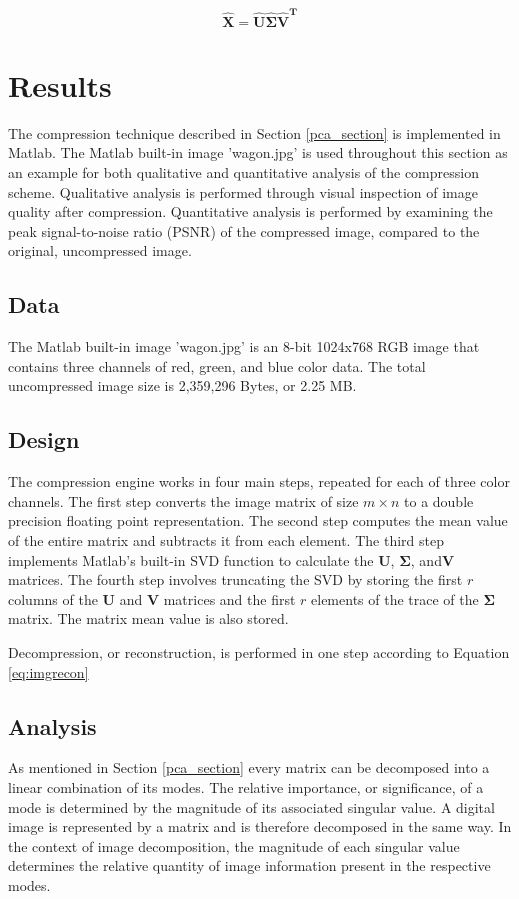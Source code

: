 \documentclass[conference]{IEEEtran}
\begin{document}
    \begin{equation}
        \mathbf{\hat{X}} = \mathbf{\hat{U}{\hat{\Sigma}}\hat{V}^T}
    \label{eq:imgrecon}
    \end{equation}
    \section{Results}

    The compression technique described in Section \ref{pca_section} is implemented in Matlab. The Matlab built-in image 'wagon.jpg' is used throughout this section as an example for both qualitative and quantitative analysis of the compression scheme. Qualitative analysis is performed through visual inspection of image quality after compression. Quantitative analysis is performed by examining the peak signal-to-noise ratio (PSNR) of the compressed image, compared to the original, uncompressed image.

    \subsection{Data}
    The Matlab built-in image 'wagon.jpg' is an 8-bit 1024x768 RGB image that contains three channels of red, green, and blue color data. The total uncompressed image size is 2,359,296 Bytes, or 2.25 MB.

    \subsection{Design}
    The compression engine works in four main steps, repeated for each of three color channels. The first step converts the image matrix of size $m \times n$ to a double precision floating point representation. The second step computes the mean value of the entire matrix and subtracts it from each element. The third step implements Matlab's built-in SVD function to calculate the $\mathbf{U}$, $\mathbf{\Sigma}$, and$\mathbf{V}$ matrices. The fourth step involves truncating the SVD by storing the first $r$ columns of the $\mathbf{U}$ and $\mathbf{V}$ matrices and the first $r$ elements of the trace of the $\mathbf{\Sigma}$ matrix. The matrix mean value is also stored.

    Decompression, or reconstruction, is performed in one step according to Equation \ref{eq:imgrecon}
    
    \subsection{Analysis}
    As mentioned in Section \ref{pca_section} every matrix can be decomposed into a linear combination of its modes. The relative importance, or significance, of a mode is determined by the magnitude of its associated singular value. A digital image is represented by a matrix and is therefore decomposed in the same way. In the context of image decomposition, the magnitude of each singular value determines the relative quantity of image information present in the respective modes.
\end{document}
